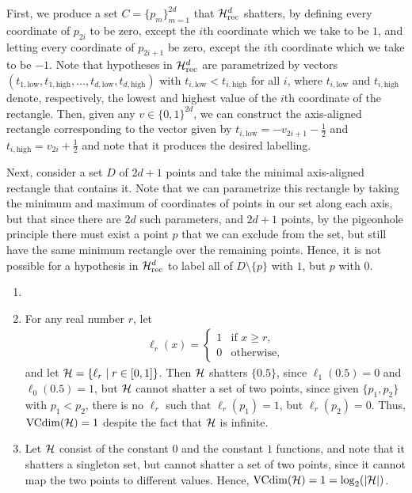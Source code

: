 \begin{ex}
  First, we produce a set $C=\{p_m\}_{m=1}^{2d}$ that $\mathcal{H}_{\text{rec}}^d$ shatters,
  by defining every coordinate of $p_{2i}$ to be zero, except the $i$th coordinate
  which we take to be $1$, and letting every coordinate of ${p_{2i+1}}$ be zero,
  except the $i$th coordinate which we take to be $-1$. Note that hypotheses in $\mathcal{H}_{\text{rec}}^d$ are
  parametrized by vectors $(t_{1,\text{low}}, t_{1,\text{high}},\ldots,t_{d,\text{low}},t_{d,\text{high}})$
  with $t_{i,\text{low}}<t_{i,\text{high}}$ for all $i$, where $t_{i,\text{low}}$ and $t_{i,\text{high}}$ denote,
  respectively, the lowest and highest value of the $i$th coordinate of the rectangle.
  Then, given any $v\in\{0, 1\}^{2d}$, we can construct the axis-aligned rectangle corresponding
  to the vector given by $t_{i,\text{low}}=-v_{2i+1}-\frac{1}{2}$ and $t_{i,\text{high}}=v_{2i}+\frac{1}{2}$
  and note that it produces the desired labelling.

  Next, consider a set $D$ of $2d+1$ points and take the minimal axis-aligned rectangle
  that contains it. Note that we can parametrize this rectangle by taking the minimum and maximum
  of coordinates of points in our set along each axis, but that since there are $2d$ such
  parameters, and $2d+1$ points, by the pigeonhole principle there must exist a point $p$ that
  we can exclude from the set, but still have the same minimum rectangle over the remaining points.
  Hence, it is not possible for a hypothesis in $\mathcal{H}_{\text{rec}}^d$ to label all of $D\setminus\{p\}$ with $1$, but $p$ with $0$.
\end{ex}

\begin{ex}
\end{ex}

\begin{ex}
  \begin{enumerate}
    \item[]
    \item For any real number $r$, let
          \begin{align*}
            \ell_r(x)=\begin{cases}
              1 & \text{if $x \geq r$}, \\
              0 & \text{otherwise},
            \end{cases}
          \end{align*}
          and let $\mathcal{H}=\{\ell_r \mid r\in [0, 1] \}$. Then $\mathcal{H}$ shatters $\{0.5\}$, since $\ell_1(0.5)=0$ and $\ell_0(0.5)=1$,
          but $\mathcal{H}$ cannot shatter a set of two points, since
          given $\{p_1, p_2\}$ with $p_1 < p_2$, there is no $\ell_r$ such that $\ell_r(p_1) = 1$, but $\ell_r(p_2)=0$.
          Thus, $\operatorname*{VCdim}(\mathcal{H})=1$ despite the fact that $\mathcal{H}$ is infinite.
    \item Let $\mathcal{H}$ consist of the constant $0$ and the constant $1$ functions, and note that it
          shatters a singleton set, but cannot shatter a set of two points, since it cannot map the two
          points to different values. Hence, $\operatorname*{VCdim}(\mathcal{H})=1=\log_2(|\mathcal{H}|)$.
  \end{enumerate}
\end{ex}


